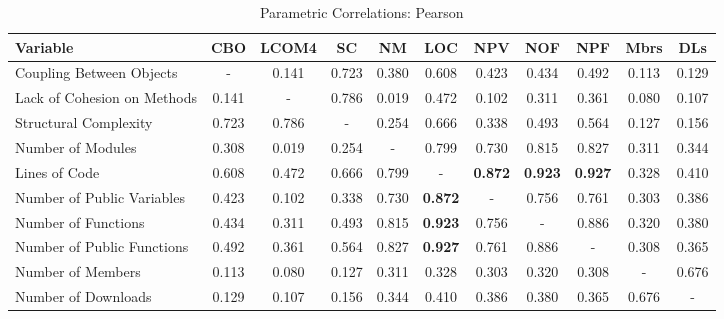 \documentclass[conference]{IEEEtran}
\begin{document}
\begin{center}
\begin{table}[hbt]
\centering \caption{Parametric Correlations: Pearson}
\begin{tabular}{|l|c|c|c|c|c|c|c|c|c|c|} \hline

\textbf{Variable}           & CBO & LCOM4 & SC & NM & LOC & NPV & NOF & NPF & Mbrs & DLs
\\ \hline
Coupling Between Objects      & - & 0.141 & 0.723 & 0.380 & 0.608 & 0.423 & 0.434 & 0.492 & 0.113 & 0.129
\\ \hline
Lack of Cohesion on Methods & 0.141 & - & 0.786 & 0.019 & 0.472 & 0.102 & 0.311 & 0.361 & 0.080 & 0.107
\\ \hline
Structural Complexity       & 0.723 & 0.786 & - & 0.254 & 0.666 & 0.338 & 0.493 & 0.564 & 0.127 & 0.156
\\ \hline
Number of Modules           & 0.308 & 0.019 & 0.254 & - & 0.799 & 0.730 & 0.815 & 0.827 & 0.311 & 0.344
\\ \hline
Lines of Code               & 0.608 & 0.472 & 0.666 & 0.799 & - & \textbf{0.872} & \textbf{0.923} & \textbf{0.927} & 0.328 & 0.410
\\ \hline
Number of Public Variables  & 0.423 & 0.102 & 0.338 & 0.730 & \textbf{0.872} & - & 0.756 & 0.761 & 0.303 & 0.386
\\ \hline
Number of Functions         & 0.434 & 0.311 & 0.493 & 0.815 & \textbf{0.923} & 0.756 & - & 0.886 & 0.320 & 0.380
\\ \hline
Number of Public Functions  & 0.492 & 0.361 & 0.564 & 0.827 & \textbf{0.927} & 0.761 & 0.886 & - & 0.308 & 0.365
\\ \hline
Number of Members           & 0.113 & 0.080 & 0.127 & 0.311 & 0.328 & 0.303 & 0.320 & 0.308 & - & 0.676
\\ \hline
Number of Downloads         & 0.129 & 0.107 & 0.156 & 0.344 & 0.410 & 0.386 & 0.380 & 0.365 & 0.676 & -
\\ \hline
\end{tabular}
\label{pearson}
\end{table}
\end{center}
\end{document}
